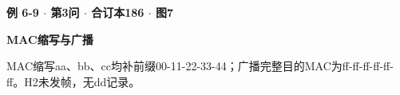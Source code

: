 {\color{ink}\bfseries 例 6-9 \(\cdot \) 第3问 \(\cdot \) 合订本186 \(\cdot \) 图7}\par \textbf{MAC缩写与广播}\par\vspace{2bp}MAC缩写aa、bb、cc均补前缀00-11-22-33-44；广播完整目的MAC为ff-ff-ff-ff-ff-ff。H2未发帧，无dd记录。
